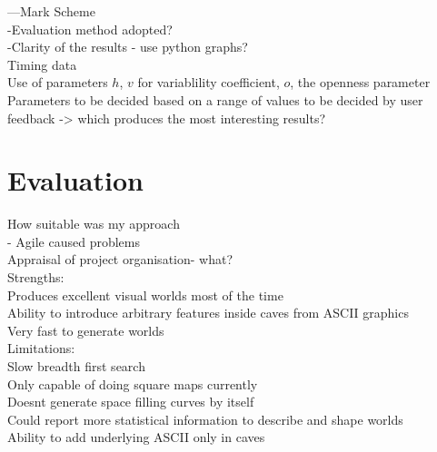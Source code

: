 \documentclass[12pt,a4paper]{article}
\begin{document}
---Mark Scheme\\
-Evaluation method adopted? \\
-Clarity of the results - use python graphs?\\

Timing data\\

Use of parameters $h$, $v$ for variablility coefficient, $o$, the openness parameter\\

Parameters to be decided based on a range of values to be decided by user feedback -> which produces the most interesting results?\\



\section{Evaluation}

How suitable was my approach\\
- Agile caused problems \\
Appraisal of project organisation- what? \\

Strengths:\\
Produces excellent visual worlds most of the time\\
Ability to introduce arbitrary features inside caves from ASCII graphics \\
Very fast to generate worlds \\


Limitations:\\
Slow breadth first search\\
Only capable of doing square maps currently\\
Doesnt generate space filling curves by itself \\
Could report more statistical information to describe and shape worlds \\
Ability to add underlying ASCII only in caves \\





\end{document}
